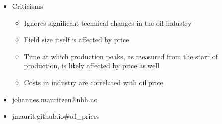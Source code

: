 \documentclass{beamer}
\begin{document}
\begin{frame}[plain]
	\begin{itemize}
	\item[] Criticisms
		\begin{itemize}
			\item Ignores significant technical changes in the oil industry
			\item Field size itself is affected by price
			\item Time at which production peaks, as measured from the start of production, is likely affected by price as well
			\item Costs in industry are correlated with oil price
		\end{itemize}
	\end{itemize}
\end{frame}

\begin{frame}
	\begin{itemize}
		\item[] johannes.mauritzen@nhh.no 
		\item[] jmaurit.github.io\#oil\_prices
	\end{itemize}
\end{frame}
\end{document}
